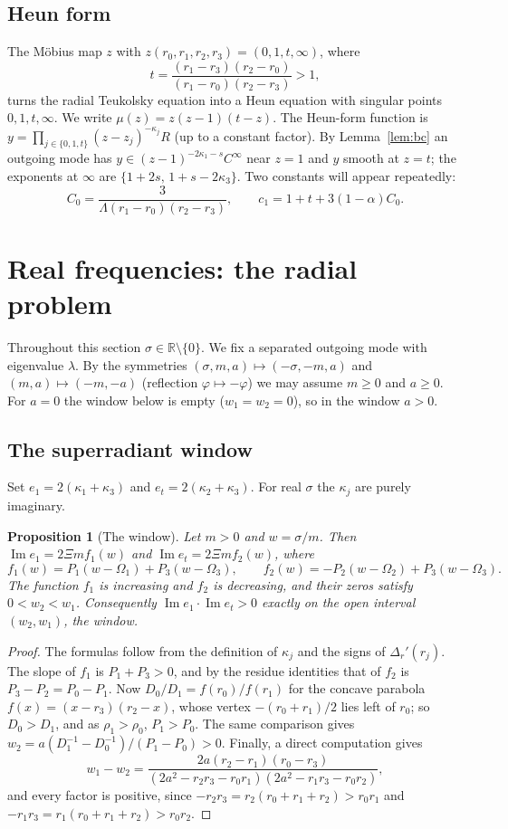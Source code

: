\documentclass[11pt]{amsart}
\newtheorem{proposition}[theorem]{Proposition}
\theoremstyle{definition}
\theoremstyle{remark}
\numberwithin{equation}{section}
\newcommand{\R}{\mathbb{R}}
\renewcommand{\Im}{\operatorname{Im}}
\begin{document}
\subsection{Heun form}
The M\"obius map $z$ with $z(r_0,r_1,r_2,r_3)=(0,1,t,\infty)$, where
\[
t=\frac{(r_1-r_3)(r_2-r_0)}{(r_1-r_0)(r_2-r_3)}>1,
\]
turns the radial Teukolsky equation into a Heun equation with singular points $0,1,t,\infty$. We write
$\mu(z)=z(z-1)(t-z)$. The Heun-form function is $y=\prod_{j\in\{0,1,t\}}(z-z_j)^{-\kappa_j}R$ (up to a constant factor).
By Lemma~\ref{lem:bc} an outgoing mode has $y\in(z-1)^{-2\kappa_1-s}C^\infty$ near $z=1$ and $y$ smooth at $z=t$; the
exponents at $\infty$ are $\{1+2s,\,1+s-2\kappa_3\}$. Two constants will appear repeatedly:
\begin{equation}\label{eq:C0}
C_0=\frac{3}{\Lambda(r_1-r_0)(r_2-r_3)},\qquad c_1=1+t+3(1-\alpha)C_0.
\end{equation}

\section{Real frequencies: the radial problem}\label{sec:radial}

Throughout this section $\sigma\in\R\setminus\{0\}$. We fix a separated outgoing mode with eigenvalue $\lambda$. By
the symmetries $(\sigma,m,a)\mapsto(-\sigma,-m,a)$ and $(m,a)\mapsto(-m,-a)$ (reflection $\varphi\mapsto-\varphi$) we may assume $m\ge0$ and $a\ge0$. For $a=0$ the window below is empty ($w_1=w_2=0$), so in the window $a>0$.

\subsection{The superradiant window}
Set $e_1=2(\kappa_1+\kappa_3)$ and $e_t=2(\kappa_2+\kappa_3)$. For real $\sigma$ the $\kappa_j$ are purely imaginary.

\begin{proposition}[The window]\label{prop:window}
Let $m>0$ and $w=\sigma/m$. Then $\Im e_1=2\Xi mf_1(w)$ and $\Im e_t=2\Xi mf_2(w)$, where
\[
f_1(w)=P_1(w-\Omega_1)+P_3(w-\Omega_3),\qquad f_2(w)=-P_2(w-\Omega_2)+P_3(w-\Omega_3).
\]
The function $f_1$ is increasing and $f_2$ is decreasing, and their zeros satisfy $0<w_2<w_1$. Consequently
$\Im e_1\cdot\Im e_t>0$ exactly on the open interval $(w_2,w_1)$, the \emph{window}.
\end{proposition}

\begin{proof}
The formulas follow from the definition of $\kappa_j$ and the signs of $\Delta_r'(r_j)$. The slope of $f_1$ is
$P_1+P_3>0$, and by the residue identities that of $f_2$ is $P_3-P_2=P_0-P_1$. Now $D_0/D_1=f(r_0)/f(r_1)$ for the
concave parabola $f(x)=(x-r_3)(r_2-x)$, whose vertex $-(r_0+r_1)/2$ lies left of $r_0$; so $D_0>D_1$, and as
$\rho_1>\rho_0$, $P_1>P_0$. The same comparison gives $w_2=a(D_1^{-1}-D_0^{-1})/(P_1-P_0)>0$. Finally, a direct computation gives
\[
w_1-w_2=\frac{2a(r_2-r_1)(r_0-r_3)}{(2a^2-r_2r_3-r_0r_1)(2a^2-r_1r_3-r_0r_2)},
\]
and every factor is positive, since $-r_2r_3=r_2(r_0+r_1+r_2)>r_0r_1$ and $-r_1r_3=r_1(r_0+r_1+r_2)>r_0r_2$.
\end{proof}
\end{document}
